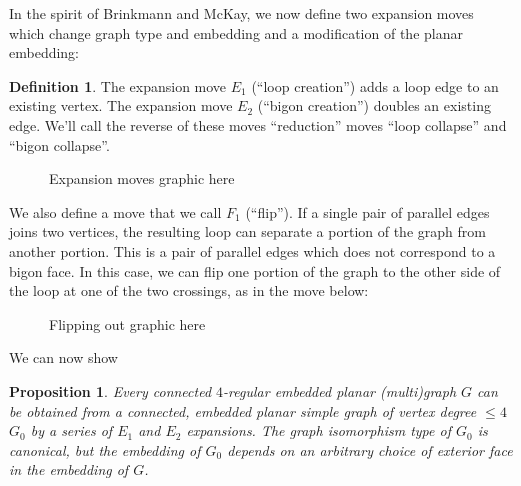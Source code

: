 \documentclass[amsmath,secnumarabic,floatfix,amssymb,nofootinbib,nobibnotes,letterpaper,11pt,tightenlines,showkeys]{revtex4}
\newtheorem{proposition}[theorem]{Proposition}
\theoremstyle{definition}
\newtheorem{definition}[theorem]{Definition}
\newcommand{\EOne}{E_1}
\newcommand{\ETwo}{E_2}
\newcommand{\FOne}{F_1}
\let\mgp=\marginpar \marginparwidth18mm \marginparsep1mm
\def\marginpar#1{\mgp{\raggedright\tiny #1}}
\let\lbl=\label
\def\label#1{\lbl{#1}\ifinner\else\marginpar{\ref{#1} #1}\ignorespaces\fi}
\begin{document}
In the spirit of Brinkmann and McKay, we now define two expansion moves which change graph type and embedding and a modification of the planar embedding: 
\begin{definition}
The expansion move $\EOne$ (``loop creation'') adds a loop edge to an existing vertex. The expansion move $\ETwo$ (``bigon creation'') doubles an existing edge. We'll call the reverse of these moves ``reduction'' moves ``loop collapse'' and ``bigon collapse''.
\begin{figure}[h]
\begin{center}
Expansion moves graphic here
\end{center}
\end{figure}
\label{def:expansions}
We also define a move that we call $\FOne$ (``flip''). If a single pair of parallel edges joins two vertices, the resulting loop can separate a portion of the graph from another portion. This is a pair of parallel edges which does not correspond to a bigon face. In this case, we can flip one portion of the graph to the other side of the loop at one of the two crossings, as in the move below:
\begin{figure}[h]
\begin{center}
Flipping out graphic here
\end{center}
\end{figure}
\end{definition}

We can now show

\begin{proposition}
Every connected $4$-regular embedded planar (multi)graph $G$ can be obtained from a connected, embedded planar simple graph of vertex degree $\leq 4$ $G_0$ by a series of $\EOne$ and $\ETwo$ expansions. The graph isomorphism type of $G_0$ is canonical, but the embedding of $G_0$ depends on an arbitrary choice of exterior face in the embedding of $G$.
\end{proposition}
\end{document}
